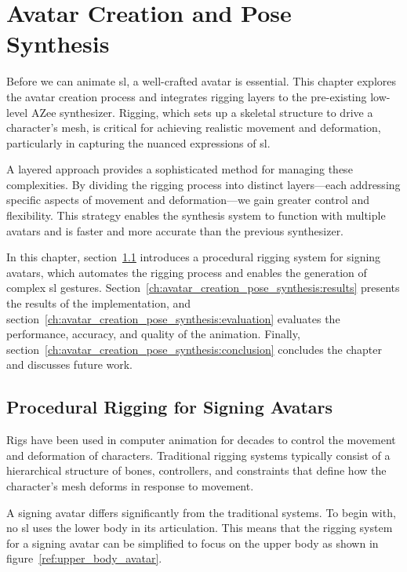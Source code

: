 \documentclass[../../main.tex]{subfiles}
\begin{document}
\chapter{Avatar Creation and Pose Synthesis}
\label{ch:avatar_creation_pose_synthesis}

Before we can animate \gls{sl}, a well-crafted avatar is essential. This chapter explores the avatar creation process and integrates rigging layers to the pre-existing low-level AZee synthesizer. Rigging, which sets up a skeletal structure to drive a character's mesh, is critical for achieving realistic movement and deformation, particularly in capturing the nuanced expressions of \gls{sl}.

A layered approach provides a sophisticated method for managing these complexities. By dividing the rigging process into distinct layers—each addressing specific aspects of movement and deformation—we gain greater control and flexibility. This strategy enables the synthesis system to function with multiple avatars and is faster and more accurate than the previous synthesizer.

In this chapter, section~\ref{ch:avatar_creation_pose_synthesis:proc_rig_signing_avatars} introduces a procedural rigging system for signing avatars, which automates the rigging process and enables the generation of complex \gls{sl} gestures. Section~\ref{ch:avatar_creation_pose_synthesis:results} presents the results of the implementation, and section~\ref{ch:avatar_creation_pose_synthesis:evaluation} evaluates the performance, accuracy, and quality of the animation. Finally, section~\ref{ch:avatar_creation_pose_synthesis:conclusion} concludes the chapter and discusses future work.

\section{Procedural Rigging for Signing Avatars}
\label{ch:avatar_creation_pose_synthesis:proc_rig_signing_avatars}

Rigs have been used in computer animation for decades to control the movement and deformation of characters. Traditional rigging systems typically consist of a hierarchical structure of bones, controllers, and constraints that define how the character’s mesh deforms in response to movement.

A signing avatar differs significantly from the traditional systems. To begin with, no \gls{sl} uses the lower body in its articulation. This means that the rigging system for a signing avatar can be simplified to focus on the upper body as shown in figure~\ref{ref:upper_body_avatar}. 
\end{document}
